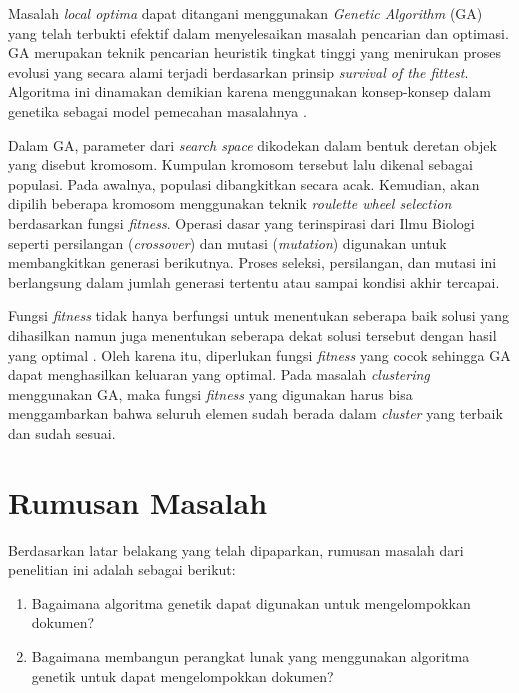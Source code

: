 Masalah \textit{local optima} dapat ditangani menggunakan \textit{Genetic Algorithm} (GA) yang telah terbukti efektif dalam menyelesaikan masalah pencarian dan optimasi. GA merupakan teknik pencarian heuristik tingkat tinggi yang menirukan proses evolusi yang secara alami terjadi \cite{holland1992genetic} berdasarkan prinsip \textit{survival of the fittest}. Algoritma ini dinamakan demikian karena menggunakan konsep-konsep dalam genetika sebagai model pemecahan masalahnya \cite{sivanandam2007introduction}.

Dalam GA, parameter dari \textit{search space} dikodekan dalam bentuk deretan objek yang disebut kromosom. Kumpulan kromosom tersebut lalu dikenal sebagai populasi. Pada awalnya, populasi dibangkitkan secara acak. Kemudian, akan dipilih beberapa kromosom menggunakan teknik \textit{roulette wheel selection} berdasarkan fungsi \textit{fitness}. Operasi dasar yang terinspirasi dari Ilmu Biologi seperti persilangan (\textit{crossover}) dan mutasi (\textit{mutation}) digunakan untuk membangkitkan generasi berikutnya. Proses seleksi, persilangan, dan mutasi ini berlangsung dalam jumlah generasi tertentu atau sampai kondisi akhir tercapai.

Fungsi \textit{fitness} tidak hanya berfungsi untuk menentukan seberapa baik solusi yang dihasilkan namun juga menentukan seberapa dekat solusi tersebut dengan hasil yang optimal \cite{sivanandam2007introduction}. Oleh karena itu, diperlukan fungsi \textit{fitness} yang cocok sehingga GA dapat menghasilkan keluaran yang optimal. Pada masalah \textit{clustering} menggunakan GA, maka fungsi \textit{fitness} yang digunakan harus bisa menggambarkan bahwa seluruh elemen sudah berada dalam \textit{cluster} yang terbaik dan sudah sesuai.

\section{Rumusan Masalah}
\label{sec:rumusan}
Berdasarkan latar belakang yang telah dipaparkan, rumusan masalah dari penelitian ini adalah sebagai berikut:

\begin{enumerate}
 \item Bagaimana algoritma genetik dapat digunakan untuk mengelompokkan dokumen?
 \item Bagaimana membangun perangkat lunak yang menggunakan algoritma genetik untuk dapat mengelompokkan
dokumen?
\end{enumerate}

